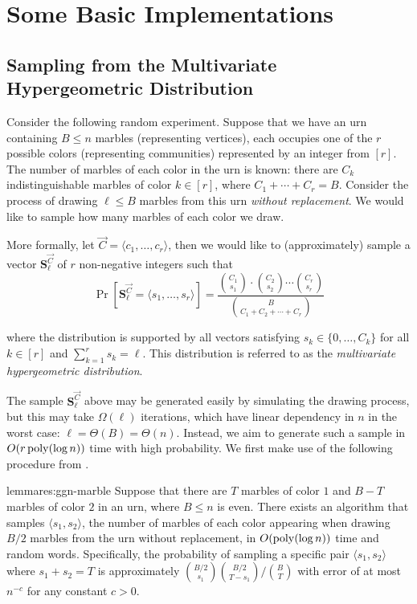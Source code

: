 \section{Some Basic Implementations}%
\label{sec:building_blocks}

\subsection{Sampling from the Multivariate Hypergeometric Distribution}
\label{sec:multivariate_hypergeometric_sampling}

Consider the following random experiment. Suppose that we have an urn containing $B \leq n$ marbles (representing vertices), each occupies one of the $r$ possible colors (representing communities) represented by an integer from $[r]$. The number of marbles of each color in the urn is known: there are $C_k$ indistinguishable marbles of color $k \in [r]$, where $C_1 + \cdots + C_r = B$. Consider the process of drawing $\ell \leq B$ marbles from this urn \emph{without replacement}. We would like to sample how many marbles of each color we draw.

More formally, let $\vec{C} = \langle c_1, \ldots, c_r \rangle$, then we would like to (approximately) sample a vector $\mathbf{S}^\vec{C}_\ell$ of $r$ non-negative integers such that
\[\Pr[\mathbf{S}^\vec{C}_\ell = \langle s_1, \ldots, s_r \rangle]
= \frac{{C_1\choose s_1}\cdot{C_2\choose s_2}\cdots{C_r\choose s_r}}{{B \choose C_1+C_2+ \cdots +C_r}}\]

where the distribution is supported by all vectors satisfying $s_k \in \{0, \ldots, C_k\}$ for all $k \in [r]$ and $\sum_{k=1}^{r} s_k = \ell$. This distribution is referred to as the \emph{multivariate hypergeometric distribution}.

The sample $\mathbf{S}^\vec{C}_\ell$ above may be generated easily by simulating the drawing process, but this may take $\Omega(\ell)$ iterations, which have linear dependency in $n$ in the worst case: $\ell = \Theta(B) = \Theta(n)$. Instead, we aim to generate such a sample in $O(r\,\mathrm{poly}(\log n))$ time with high probability. We first make use of the following procedure from \cite{huge}.

\begin{restatable}{lemma}{res:ggn-marble}\label{claim:ggn}
Suppose that there are $T$ marbles of color $1$ and $B-T$ marbles of color $2$ in an urn,
where $B \leq n$ is even. There exists an algorithm that samples $\langle s_1, s_2 \rangle$,
the number of marbles of each color appearing when drawing $B/2$ marbles from the urn without replacement,
in $O(\mathrm{poly}(\log n))$ time and random words.
Specifically, the probability of sampling a specific pair $\langle s_1, s_2 \rangle$ where $s_1 + s_2 = T$
is approximately ${B/2 \choose s_1}{B/2 \choose T-s_1}/{B \choose T}$ with error of at most $n^{-c}$ for any constant $c>0$.
\end{restatable}

